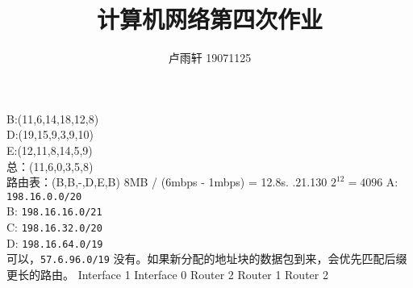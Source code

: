 \documentclass{ctexart}
\title{计算机网络第四次作业}
\author{卢雨轩 19071125}
\begin{document}
\maketitle

\begin{outline}[enumerate]
    \1[6.]
    B:(11,6,14,18,12,8)\\
    D:(19,15,9,3,9,10) \\
    E:(12,11,8,14,5,9) \\
    总：(11,6,0,3,5,8) \\
    路由表：(B,B,-,D,E,B)
    \1[19.] 
    8MB / (6mbps - 1mbps) = 12.8s.
    .21.130
    \1[28.]
    $2^12 = 4096$
    \1[30.]
    A: \texttt{198.16.0.0/20} \\
    B: \texttt{198.16.16.0/21} \\
    C: \texttt{198.16.32.0/20} \\
    D: \texttt{198.16.64.0/19} \\
    \1[31.]
    可以，\texttt{57.6.96.0/19}
    \1[32.]
    没有。如果新分配的地址块的数据包到来，会优先匹配后缀更长的路由。
    \1[33.]
    \2[(a)] Interface 1
    \2[(b)] Interface 0
    \2[(c)] Router 2
    \2[(d)] Router 1
    \2[(e)] Router 2
\end{outline}
\end{document}
